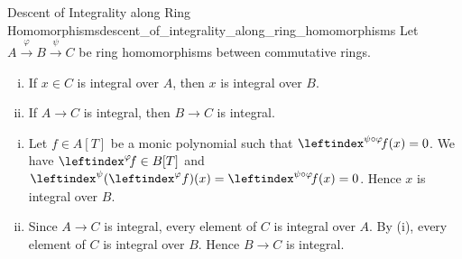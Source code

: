 \begin{proposition}{Descent of Integrality along Ring Homomorphisms}{descent_of_integrality_along_ring_homomorphisms}
    Let $A\xrightarrow{\varphi}B\xrightarrow{\psi} C$ be ring homomorphisms between commutative rings. 
    \begin{enumerate}[(i)]
        \item If $x\in C$ is integral over $A$, then $x$ is integral over $B$.
        \item If $A\to C$ is integral, then $B\to C$ is integral.
    \end{enumerate}
\end{proposition}
\begin{prf}
    \begin{enumerate}[(i)]
        \item Let $f\in A[T]$ be a monic polynomial such that $\leftindex^{\psi\circ\varphi}\!f(x)=0$. We have $\leftindex^{\varphi}\!f\in B[T]$ and $\leftindex^\psi(\leftindex^\varphi f)(x)=\leftindex^{\psi\circ\varphi}\!f(x)=0$. Hence $x$ is integral over $B$.
        \item Since $A\to C$ is integral, every element of $C$ is integral over $A$. By (i), every element of $C$ is integral over $B$. Hence $B\to C$ is integral.
    \end{enumerate}
\end{prf}

